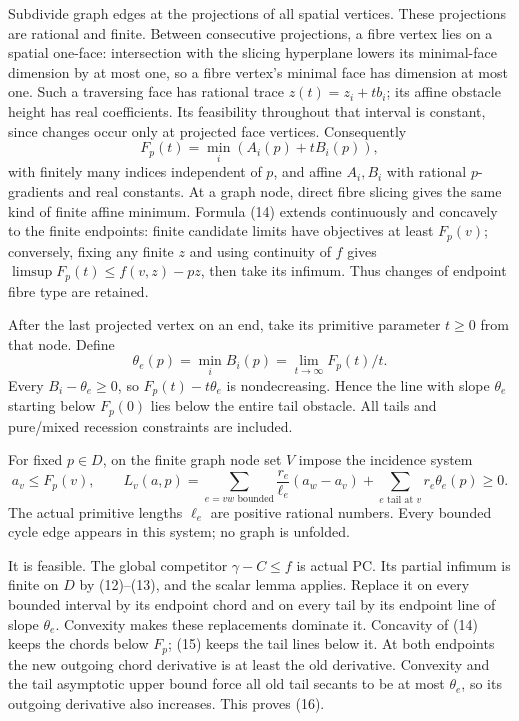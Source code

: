 \documentclass[
  11pt,
]{article}
\begin{document}
Subdivide graph edges at the projections of all spatial vertices. These
projections are rational and finite. Between consecutive projections, a
fibre vertex lies on a spatial one-face: intersection with the slicing
hyperplane lowers its minimal-face dimension by at most one, so a fibre
vertex's minimal face has dimension at most one. Such a traversing face
has rational trace \(z(t)=z_i+t b_i\); its affine obstacle height has
real coefficients. Its feasibility throughout that interval is constant,
since changes occur only at projected face vertices. Consequently \[
 F_p(t)=\min_i(A_i(p)+tB_i(p)),                              \tag{14}
\] with finitely many indices independent of \(p\), and affine
\(A_i,B_i\) with rational \(p\)-gradients and real constants. At a graph
node, direct fibre slicing gives the same kind of finite affine minimum.
Formula (14) extends continuously and concavely to the finite endpoints:
finite candidate limits have objectives at least \(F_p(v)\); conversely,
fixing any finite \(z\) and using continuity of \(f\) gives
\(\limsup F_p(t)\leq f(v,z)-pz\), then take its infimum. Thus changes of
endpoint fibre type are retained.

After the last projected vertex on an end, take its primitive parameter
\(t\geq0\) from that node. Define \[
 \theta_e(p)=\min_iB_i(p)=\lim_{t\to\infty}F_p(t)/t.          \tag{15}
\] Every \(B_i-\theta_e\geq0\), so \(F_p(t)-t\theta_e\) is
nondecreasing. Hence the line with slope \(\theta_e\) starting below
\(F_p(0)\) lies below the entire tail obstacle. All tails and pure/mixed
recession constraints are included.

For fixed \(p\in D\), on the finite graph node set \(V\) impose the
incidence system \[
 a_v\leq F_p(v),\qquad
 L_v(a,p)=\sum_{e=vw\text{ bounded}}\frac{r_e}{\ell_e}(a_w-a_v)
              +\sum_{e\text{ tail at }v}r_e\theta_e(p)\geq0.             \tag{16}
\] The actual primitive lengths \(\ell_e\) are positive rational
numbers. Every bounded cycle edge appears in this system; no graph is
unfolded.

It is feasible. The global competitor \(\gamma-C\leq f\) is actual PC.
Its partial infimum is finite on \(D\) by (12)--(13), and the scalar
lemma applies. Replace it on every bounded interval by its endpoint
chord and on every tail by its endpoint line of slope \(\theta_e\).
Convexity makes these replacements dominate it. Concavity of (14) keeps
the chords below \(F_p\); (15) keeps the tail lines below it. At both
endpoints the new outgoing chord derivative is at least the old
derivative. Convexity and the tail asymptotic upper bound force all old
tail secants to be at most \(\theta_e\), so its outgoing derivative also
increases. This proves (16).
\end{document}
